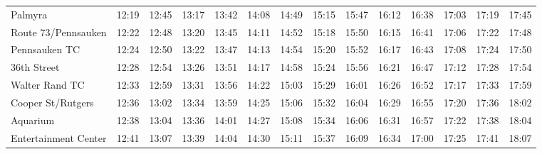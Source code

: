 \begin{center}
\begin{tabular}{@{}lrrrrrrrrrrrrr@{}}
Palmyra & 12:19 & 12:45 & 13:17 & 13:42 & 14:08 & 14:49 & 15:15 & 15:47 & 16:12 & 16:38 & 17:03 & 17:19 & 17:45 \\
Route 73/Pennsauken & 12:22 & 12:48 & 13:20 & 13:45 & 14:11 & 14:52 & 15:18 & 15:50 & 16:15 & 16:41 & 17:06 & 17:22 & 17:48 \\
Pennsauken TC & 12:24 & 12:50 & 13:22 & 13:47 & 14:13 & 14:54 & 15:20 & 15:52 & 16:17 & 16:43 & 17:08 & 17:24 & 17:50 \\
36th Street & 12:28 & 12:54 & 13:26 & 13:51 & 14:17 & 14:58 & 15:24 & 15:56 & 16:21 & 16:47 & 17:12 & 17:28 & 17:54 \\
Walter Rand TC & 12:33 & 12:59 & 13:31 & 13:56 & 14:22 & 15:03 & 15:29 & 16:01 & 16:26 & 16:52 & 17:17 & 17:33 & 17:59 \\
Cooper St/Rutgers & 12:36 & 13:02 & 13:34 & 13:59 & 14:25 & 15:06 & 15:32 & 16:04 & 16:29 & 16:55 & 17:20 & 17:36 & 18:02 \\
Aquarium & 12:38 & 13:04 & 13:36 & 14:01 & 14:27 & 15:08 & 15:34 & 16:06 & 16:31 & 16:57 & 17:22 & 17:38 & 18:04 \\
Entertainment Center & 12:41 & 13:07 & 13:39 & 14:04 & 14:30 & 15:11 & 15:37 & 16:09 & 16:34 & 17:00 & 17:25 & 17:41 & 18:07 \\
\bottomrule\end{tabular}\end{center}
